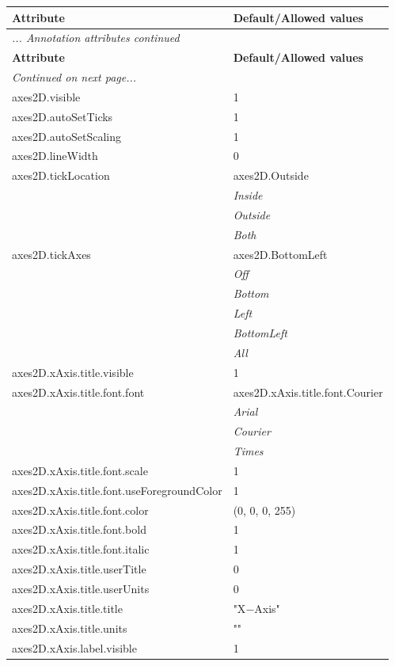 \documentclass[10pt,a4paper]{report}
\begin{document}
\begin{longtable}{ll}
{\bf Attribute} & {\bf Default/Allowed values} \\
\hline \hline
\endfirsthead
\multicolumn{2}{l}{{\it ... Annotation attributes continued}} \\
{\bf Attribute} & {\bf Default/Allowed values} \\
\hline \hline
\endhead
\hline
\multicolumn{2}{l}{{\it Continued on next page...}} \\
\endfoot
\hline
\endlastfoot

axes2D.visible  &  1 \\
axes2D.autoSetTicks  &  1 \\
axes2D.autoSetScaling  &  1 \\
axes2D.lineWidth  &  0 \\
axes2D.tickLocation  &  axes2D.Outside   \\
 & {\it  Inside} \\
 & {\it  Outside} \\
 & {\it  Both} \\
axes2D.tickAxes  &  axes2D.BottomLeft   \\
 & {\it  Off} \\
 & {\it  Bottom} \\
 & {\it  Left} \\
 & {\it  BottomLeft} \\
 & {\it  All} \\
axes2D.xAxis.title.visible  &  1 \\
axes2D.xAxis.title.font.font  &  axes2D.xAxis.title.font.Courier   \\
 & {\it  Arial} \\
 & {\it  Courier} \\
 & {\it  Times} \\
axes2D.xAxis.title.font.scale  &  1 \\
axes2D.xAxis.title.font.useForegroundColor  &  1 \\
axes2D.xAxis.title.font.color  &  (0, 0, 0, 255) \\
axes2D.xAxis.title.font.bold  &  1 \\
axes2D.xAxis.title.font.italic  &  1 \\
axes2D.xAxis.title.userTitle  &  0 \\
axes2D.xAxis.title.userUnits  &  0 \\
axes2D.xAxis.title.title  &  "X$-$Axis" \\
axes2D.xAxis.title.units  &  "" \\
axes2D.xAxis.label.visible  &  1 \\

\end{longtable}
\end{document}
